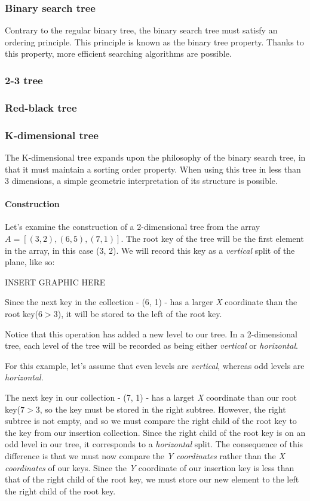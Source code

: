 \documentclass{article}
\begin{document}
\subsubsection{Binary search tree}
Contrary to the regular binary tree, the binary search tree must satisfy an ordering principle.
This principle is known as the binary tree property. Thanks to this property,
more efficient searching algorithms are possible.

\subsubsection{2-3 tree}
\subsubsection{Red-black tree}

\subsubsection{K-dimensional tree}
The K-dimensional tree expands upon the philosophy of the binary search tree, in that it
must maintain a sorting order property. When using this tree in less than 3 dimensions,
a simple geometric interpretation of its structure is possible.

\paragraph{Construction}
Let's examine the construction of a 2-dimensional tree from the array \(A = [(3, 2), (6, 5), (7, 1)]\).
The root key of the tree will be the first element in the array, in this case (3, 2).
We will record this key as a {\em vertical} split of the plane, like so:

{\huge INSERT GRAPHIC HERE}

Since the next key in the collection - (6, 1) - has a larger {\em X} coordinate than the root key(\(6 > 3\)), it will be stored to the left of the root key.

Notice that this operation has added a new level to our tree. In a 2-dimensional tree, each level of the tree will be recorded as being either {\em vertical} or {\em horizontal}.

For this example, let's assume that even levels are {\em vertical}, whereas odd levels are {\em horizontal}.

The next key in our collection - (7, 1) - has a larget {\em X} coordinate than our root key(\(7 > 3\), so the key must be stored in the right subtree. However, the right subtree is not empty, and so we must compare the right child of the root key to the key from our insertion collection. Since the right child of the root key is on an odd level in our tree, it corresponds to a {\em horizontal} split. The consequence of this difference is that we must now compare the {\em Y coordinates} rather than the {\em X coordinates} of our keys. Since the {\em Y} coordinate of our insertion key is less than that of the right child of the root key, we must store our new element to the left the right child of the root key.
\end{document}

